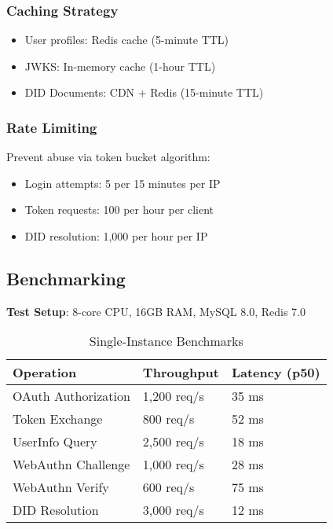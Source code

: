 \documentclass[11pt,a4paper]{article}
\begin{document}
\subsubsection{Caching Strategy}

\begin{itemize}
  \item User profiles: Redis cache (5-minute TTL)
  \item JWKS: In-memory cache (1-hour TTL)
  \item DID Documents: CDN + Redis (15-minute TTL)
\end{itemize}

\subsubsection{Rate Limiting}

Prevent abuse via token bucket algorithm:
\begin{itemize}
  \item Login attempts: 5 per 15 minutes per IP
  \item Token requests: 100 per hour per client
  \item DID resolution: 1,000 per hour per IP
\end{itemize}

\subsection{Benchmarking}

\textbf{Test Setup}: 8-core CPU, 16GB RAM, MySQL 8.0, Redis 7.0

\begin{table}[h]
\centering
\begin{tabular}{@{}lll@{}}
\toprule
\textbf{Operation} & \textbf{Throughput} & \textbf{Latency (p50)} \\ \midrule
OAuth Authorization & 1,200 req/s & 35 ms \\
Token Exchange & 800 req/s & 52 ms \\
UserInfo Query & 2,500 req/s & 18 ms \\
WebAuthn Challenge & 1,000 req/s & 28 ms \\
WebAuthn Verify & 600 req/s & 75 ms \\
DID Resolution & 3,000 req/s & 12 ms \\ \bottomrule
\end{tabular}
\caption{Single-Instance Benchmarks}
\end{table}
\end{document}
